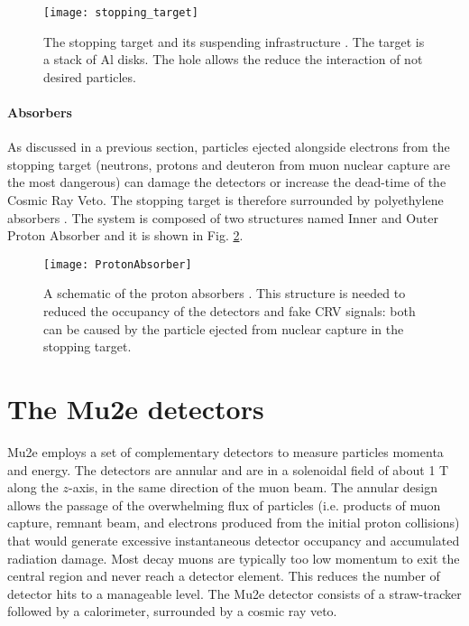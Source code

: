 \documentclass[12pt,a4paper,openright, oneside, titlepage]{book} %
\begin{document}
\begin{figure}[h!]
\centering
\texttt{[image: stopping\_target]} %
\caption{The stopping target and its suspending infrastructure \cite{stopping_target}. The target is a stack of Al disks. The hole allows the reduce the interaction of not desired particles.}
\label{_stopping_target}
\end{figure}

\paragraph{Absorbers} As discussed in a previous section, particles ejected alongside electrons from the stopping target (neutrons, protons and deuteron from muon nuclear capture are the most dangerous) can damage the detectors or increase the dead-time of the Cosmic Ray Veto. 
The stopping target is therefore surrounded by polyethylene absorbers \cite{stopping_target}. 
The system is composed of two structures 
named Inner and Outer Proton Absorber and it is shown in Fig. \ref{_ProtonAbsorber}.

\begin{figure}[h!]
\centering
\texttt{[image: ProtonAbsorber]}
\caption{A schematic of the proton absorbers \cite{stopping_target}. This structure is needed to reduced the occupancy of the detectors and fake CRV signals: both can be caused by the particle ejected from nuclear capture in the stopping target.}
\label{_ProtonAbsorber}
\end{figure}


\section{The Mu2e detectors}
Mu2e employs a set of complementary detectors to measure particles momenta and energy.
The detectors are annular and are in a solenoidal field of about 1 T along the $z$-axis, in the
same direction of the muon beam. The annular design allows the passage of the overwhelming
flux of particles (i.e. products of muon capture, remnant beam, and electrons produced from the
initial proton collisions) that would generate excessive instantaneous detector occupancy and
accumulated radiation damage. Most decay muons are typically too low momentum to exit the
central region and never reach a detector element. This reduces the number of detector hits to a manageable level. The Mu2e detector consists of a straw-tracker followed by a calorimeter, surrounded by a cosmic ray veto.
\end{document}

